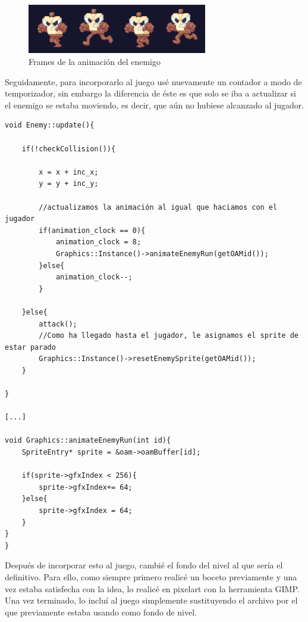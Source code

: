  \vspace{0.5cm}

\begin{figure}[htbp]
\centering
  \includegraphics[width=0.7\textwidth]{archivos/enemy_animation.png}
  \caption{Frames de la animación del enemigo}
  \label{fig:enemy_animation}
\end{figure}

 \vspace{0.5cm}

Seguidamente, para incorporarlo al juego usé nuevamente un contador a modo de temporizador, sin embargo la diferencia de éste es que solo se iba a actualizar si el enemigo se estaba moviendo, es decir, que aún no hubiese alcanzado al jugador.

 \vspace{0.5cm}

   \begin{lstlisting}[caption={Animación del sprite del enemigo al moverse}, label={code:animacionenemy}]
void Enemy::update(){

	if(!checkCollision()){

		x = x + inc_x;
		y = y + inc_y;

		//actualizamos la animación al igual que haciamos con el jugador
		if(animation_clock == 0){
			animation_clock = 8;
			Graphics::Instance()->animateEnemyRun(getOAMid());
		}else{
			animation_clock--;
		}

	}else{
		attack();
		//Como ha llegado hasta el jugador, le asignamos el sprite de estar parado
		Graphics::Instance()->resetEnemySprite(getOAMid());
	}

}

[...]

void Graphics::animateEnemyRun(int id){
    SpriteEntry* sprite = &oam->oamBuffer[id];

    if(sprite->gfxIndex < 256){
        sprite->gfxIndex+= 64;
    }else{
        sprite->gfxIndex = 64;
    }
}
}
\end{lstlisting}

 \vspace{0.5cm}

Después de incorporar esto al juego, cambié el fondo del nivel al que sería el definitivo. Para ello, como siempre primero realicé un boceto previamente y una vez estaba satisfecha con la idea, lo realicé en pixelart con la herramienta GIMP. Una vez terminado, lo incluí al juego simplemente sustituyendo el archivo por el que previamente estaba usando como fondo de nivel.

